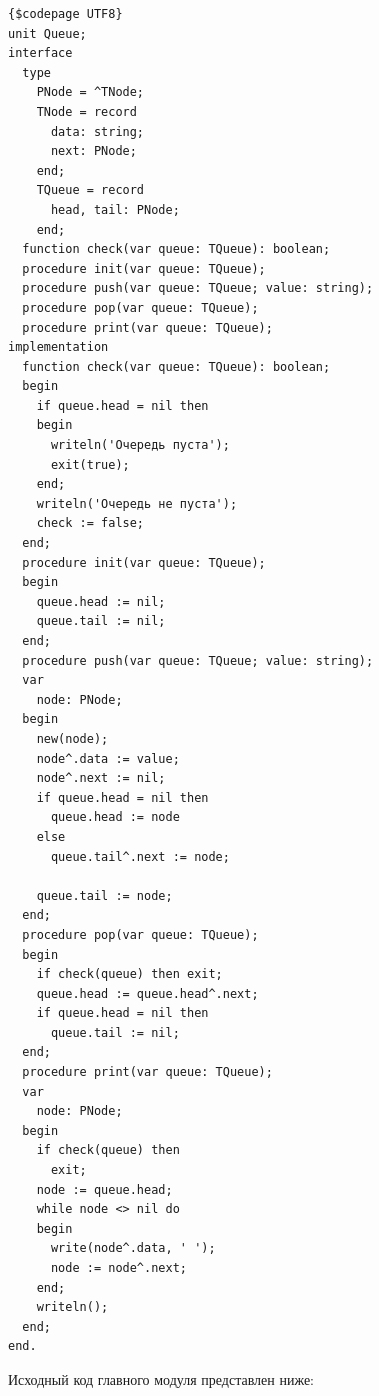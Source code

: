 \documentclass[a4paper,14pt]{extarticle}
\begin{document}
  \noindent
  \begin{Verbatim}[tabsize=4,fontsize=\small]
{$codepage UTF8}
unit Queue;
interface
  type
    PNode = ^TNode;
    TNode = record
      data: string;
      next: PNode;
    end;
    TQueue = record
      head, tail: PNode;
    end;
  function check(var queue: TQueue): boolean;
  procedure init(var queue: TQueue);
  procedure push(var queue: TQueue; value: string);
  procedure pop(var queue: TQueue);
  procedure print(var queue: TQueue);
implementation
  function check(var queue: TQueue): boolean;
  begin
    if queue.head = nil then
    begin
      writeln('Очередь пуста');
      exit(true);
    end;
    writeln('Очередь не пуста');
    check := false;
  end;
  procedure init(var queue: TQueue);
  begin
    queue.head := nil;
    queue.tail := nil;
  end;
  procedure push(var queue: TQueue; value: string);
  var
    node: PNode;
  begin
    new(node);
    node^.data := value;
    node^.next := nil;
    if queue.head = nil then
      queue.head := node
    else
      queue.tail^.next := node;

    queue.tail := node;
  end;
  procedure pop(var queue: TQueue);
  begin
    if check(queue) then exit;
    queue.head := queue.head^.next;
    if queue.head = nil then
      queue.tail := nil;
  end;
  procedure print(var queue: TQueue);
  var
    node: PNode;
  begin
    if check(queue) then
      exit;
    node := queue.head;
    while node <> nil do
    begin
      write(node^.data, ' ');
      node := node^.next;
    end;
    writeln();
  end;
end.
  \end{Verbatim}

  Исходный код главного модуля представлен ниже:
\end{document}
